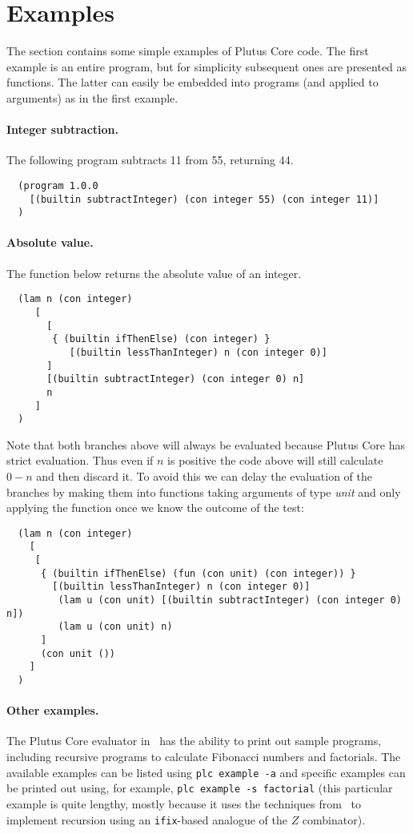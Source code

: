 \documentclass[a4paper]{article}
\begin{document}
\section{Examples}
\label{sec:examples}
The section contains some simple examples of Plutus Core code. The
first example is an entire program, but for simplicity subsequent ones
are presented as functions. The latter can easily be embedded into
programs (and applied to arguments) as in the first example.

\paragraph{Integer subtraction.}
The following program subtracts 11 from 55, returning 44.

\begin{verbatim}
  (program 1.0.0
    [(builtin subtractInteger) (con integer 55) (con integer 11)]
  )
\end{verbatim}


\paragraph{Absolute value.} The function below returns the absolute value of an
integer.
\begin{verbatim}
  (lam n (con integer)
     [
       [
        { (builtin ifThenElse) (con integer) } 
           [(builtin lessThanInteger) n (con integer 0)]
       ]
       [(builtin subtractInteger) (con integer 0) n]
       n
     ]
  )
\end{verbatim}

\noindent Note that both branches above will always be evaluated because Plutus
Core has strict evaluation.  Thus even if $n$ is positive the code above will
still calculate $0-n$ and then discard it.  To avoid this we can delay
the evaluation of the branches by making them into functions taking
arguments of type \textit{unit} and only applying the function once we
know the outcome of the test:

\begin{verbatim}
  (lam n (con integer)
    [
     [
      { (builtin ifThenElse) (fun (con unit) (con integer)) } 
        [(builtin lessThanInteger) n (con integer 0)]
         (lam u (con unit) [(builtin subtractInteger) (con integer 0) n])
         (lam u (con unit) n)
      ]
      (con unit ())
    ]
  )
\end{verbatim}

\paragraph{Other examples.} The Plutus Core evaluator in~\citep{Plutus-exe-repo}
has the ability to print out sample programs, including recursive
programs to calculate Fibonacci numbers and factorials.  The available
examples can be listed using \verb|plc example -a| and specific
examples can be printed out using, for example,
\verb|plc example -s factorial| (this particular example is quite lengthy, mostly because
it uses the techniques from~\citep{unravelling-recursion} to implement
recursion using an \verb|ifix|-based analogue of the $Z$ combinator).
\end{document}
